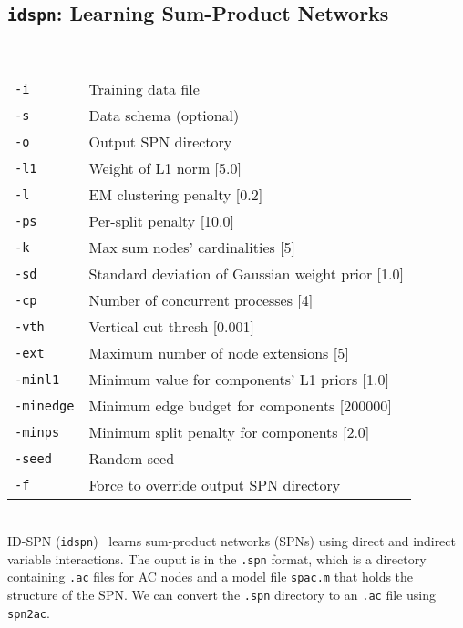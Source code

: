 \documentclass[11pt]{article}
\begin{document}
\subsection{{\tt idspn}: Learning Sum-Product Networks} \label{sec:idspn}

\noindent {} \\
\begin{tabular}{ll}
{\tt -i} &        Training data file \\
{\tt -s} &        Data schema (optional) \\
{\tt -o} &        Output SPN directory \\
{\tt -l1} &       Weight of L1 norm [5.0] \\
{\tt -l} &        EM clustering penalty [0.2] \\
{\tt -ps} &       Per-split penalty [10.0] \\
{\tt -k} &        Max sum nodes' cardinalities [5] \\
{\tt -sd} &       Standard deviation of Gaussian weight prior [1.0] \\
{\tt -cp} &       Number of concurrent processes [4] \\
{\tt -vth} &      Vertical cut thresh [0.001] \\
{\tt -ext} &      Maximum number of node extensions [5] \\
{\tt -minl1} &    Minimum value for components' L1 priors [1.0] \\
{\tt -minedge} &  Minimum edge budget for components [200000] \\
{\tt -minps} &    Minimum split penalty for components [2.0] \\
{\tt -seed} &     Random seed \\
{\tt -f} &        Force to override output SPN directory \\
\end{tabular} \\

ID-SPN ({\tt idspn})~\cite{rooshenas&lowd14} learns sum-product
networks (SPNs) using direct and indirect variable interactions. The
ouput is in the {\tt .spn} format, which is a directory containing
{\tt .ac} files for AC nodes and a model file {\tt spac.m} that holds
the structure of the SPN. We can convert the {\tt .spn} directory to
an {\tt .ac} file using {\tt spn2ac}.
\end{document}
